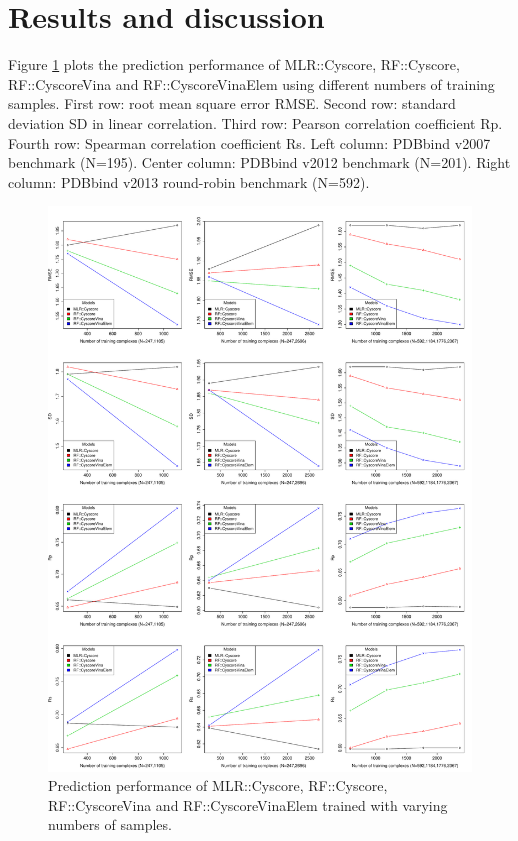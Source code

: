 \section{Results and discussion}

Figure \ref{rfcyscore:stat} plots the prediction performance of MLR::Cyscore, RF::Cyscore, RF::CyscoreVina and RF::CyscoreVinaElem using different numbers of training samples. First row: root mean square error RMSE. Second row: standard deviation SD in linear correlation. Third row: Pearson correlation coefficient Rp. Fourth row: Spearman correlation coefficient Rs. Left column: PDBbind v2007 benchmark (N=195). Center column: PDBbind v2012 benchmark (N=201). Right column: PDBbind v2013 round-robin benchmark (N=592).

\begin{figure}
\includegraphics[width=\linewidth]{../rfcyscore/stat.pdf}
\caption{Prediction performance of MLR::Cyscore, RF::Cyscore, RF::CyscoreVina and RF::CyscoreVinaElem trained with varying numbers of samples.}
\label{rfcyscore:stat}
\end{figure}

